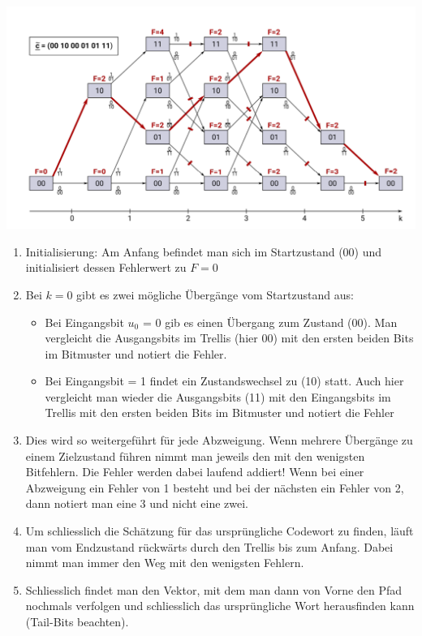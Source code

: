 \begin{center}
\includegraphics[width=1\linewidth]{images/trellis.png}
\end{center}

\begin{enumerate}
    \item Initialisierung: Am Anfang befindet man sich im Startzustand (00) und initialisiert dessen Fehlerwert zu $F=0$
    \item Bei $k=0$ gibt es zwei mögliche Übergänge vom Startzustand aus:
        \begin{itemize}
            \item Bei Eingangsbit $u_0$ = 0 gib es einen Übergang zum Zustand (00). Man vergleicht die Ausgangsbits im Trellis (hier 00) mit den ersten beiden Bits im Bitmuster und notiert die Fehler.
            \item Bei Eingangsbit = 1 findet ein Zustandswechsel zu (10) statt. Auch hier vergleicht man wieder die Ausgangsbits (11) mit den Eingangsbits im Trellis mit den ersten beiden Bits im Bitmuster und notiert die Fehler
        \end{itemize}
    \item Dies wird so weitergeführt für jede Abzweigung. Wenn mehrere Übergänge zu einem Zielzustand führen nimmt man jeweils den mit den wenigsten Bitfehlern. Die Fehler werden dabei laufend addiert! Wenn bei einer Abzweigung ein Fehler von 1 besteht und bei der nächsten ein Fehler von 2, dann notiert man eine 3 und nicht eine zwei.
    \item Um schliesslich die Schätzung für das ursprüngliche Codewort zu finden, läuft man vom Endzustand rückwärts durch den Trellis bis zum Anfang. Dabei nimmt man immer den Weg mit den wenigsten Fehlern.
    \item Schliesslich findet man den Vektor, mit dem man dann von Vorne den Pfad nochmals verfolgen und schliesslich das ursprüngliche Wort herausfinden kann (Tail-Bits beachten).
\end{enumerate}

